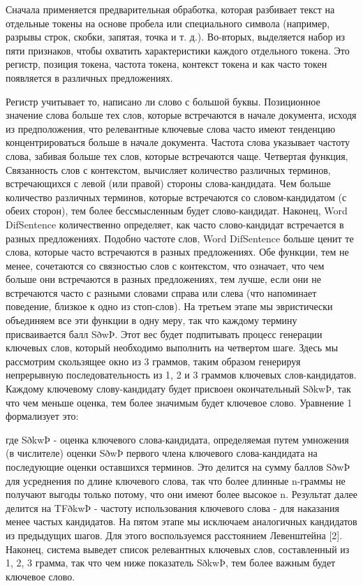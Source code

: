 \documentclass[14pt]{matmex-diploma-custom}
\begin{document}
Сначала применяется предварительная обработка, которая разбивает текст на отдельные токены на основе пробела или специального символа (например, разрывы строк, скобки, запятая, точка и т. д.). Во-вторых, выделяется набор из пяти признаков, чтобы охватить характеристики каждого отдельного токена. Это регистр, позиция токена, частота токена, контекст токена и как часто токен появляется в различных предложениях.

Регистр учитывает то, написано ли слово с большой буквы.
Позиционное значение слова больше тех слов, которые встречаются в начале документа, исходя из предположения, что релевантные ключевые слова часто имеют тенденцию концентрироваться больше в начале документа. Частота слова указывает частоту слова, забивая больше тех слов, которые встречаются чаще. Четвертая функция, Связанность слов с контекстом, вычисляет количество различных терминов, встречающихся с левой (или правой) стороны слова-кандидата. Чем больше количество различных терминов, которые встречаются со словом-кандидатом (с обеих сторон), тем более бессмысленным будет слово-кандидат. Наконец, Word DifSentence количественно определяет, как часто слово-кандидат встречается в разных предложениях. Подобно частоте слов, Word DifSentence больше ценит те слова, которые часто встречаются в разных предложениях. Обе функции, тем не менее, сочетаются со связностью слов с контекстом, что означает, что чем больше они встречаются в разных предложениях, тем лучше, если они не встречаются часто с разными словами справа или слева (что напоминает поведение, близкое к одно из стоп-слов). На третьем этапе мы эвристически объединяем все эти функции в одну меру, так что каждому термину присваивается балл SðwÞ. Этот вес будет подпитывать процесс генерации ключевых слов, который необходимо выполнить на четвертом шаге. Здесь мы рассмотрим скользящее окно из 3 граммов, таким образом генерируя непрерывную последовательность из 1, 2 и 3 граммов ключевых слов-кандидатов. Каждому ключевому слову-кандидату будет присвоен окончательный SðkwÞ, так что чем меньше оценка, тем более значимым будет ключевое слово. Уравнение 1 формализует это:

где SðkwÞ - оценка ключевого слова-кандидата, определяемая путем умножения (в числителе) оценки SðwÞ первого члена ключевого слова-кандидата на последующие оценки оставшихся терминов. Это делится на сумму баллов SðwÞ для усреднения по длине ключевого слова, так что более длинные n-граммы не получают выгоды только потому, что они имеют более высокое n. Результат далее делится на TFðkwÞ - частоту использования ключевого слова - для наказания менее частых кандидатов. На пятом этапе мы исключаем аналогичных кандидатов из предыдущих шагов. Для этого воспользуемся расстоянием Левенштейна [2]. Наконец, система выведет список релевантных ключевых слов, составленный из 1, 2, 3 грамма, так что чем ниже показатель SðkwÞ, тем более важным будет ключевое слово.
\end{document}
